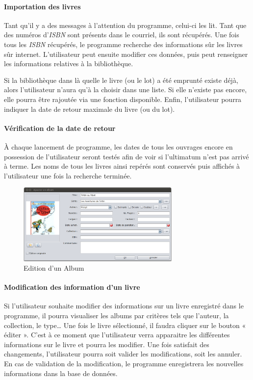 \paragraph{Importation des livres}
Tant qu'il y a des messages à l'attention du programme, celui-ci les lit. 
Tant que des numéros d'\emph{ISBN} sont présents dans le courriel, ils sont récupérés. 
Une fois tous les \emph{ISBN} récupérés, le programme recherche des informations sûr les livres sûr internet.
L'utilisateur peut ensuite modifier ces données, puis peut renseigner les informations relatives à la bibliothèque. 

Si la bibliothèque dans là quelle le livre (ou le lot) a été emprunté existe déjà, 
alors l'utilisateur n'aura qu'à la choisir dans une liste. Si elle n'existe pas encore, elle pourra être rajoutée via une fonction disponible. 
Enfin, l'utilisateur pourra indiquer la date de retour maximale du livre (ou du lot).

\paragraph{Vérification de la date de retour}
À chaque lancement de programme, les dates de tous les ouvrages encore en possession de l'utilisateur seront testés afin de voir si l'ultimatum n'est pas arrivé à terme. 
Les noms de tous les livres ainsi repérés sont conservés puis affichés à l'utilisateur une fois la recherche terminée. 


\begin{figure}
\includegraphics[width=8cm]{../img/editionAlbum.png}
\caption{Edition d'un Album}
\end{figure}

\paragraph{Modification des information d'un livre}
Si l'utilisateur souhaite modifier des informations sur un livre enregistré dans le programme, il pourra visualiser les albums par critères tels que l'auteur, la collection, le type…
Une fois le livre sélectionné, il faudra cliquer sur le bouton « éditer ».  
C'est à ce moment que l'utilisateur verra apparaitre les différentes informations sur le livre et pourra les modifier.
Une fois satisfait des changements, l'utilisateur pourra soit valider les modifications, soit les annuler. 
En cas de validation de la modification, le programme enregistrera les nouvelles informations dans la base de données.  
